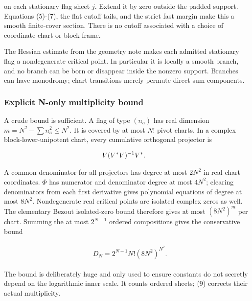 on each stationary flag sheet \(j\). Extend it by zero outside the
padded support. Equations (5)-(7), the flat cutoff tails, and the strict
fast margin make this a smooth finite-cover section. There is no cutoff
associated with a choice of coordinate chart or block frame.

The Hessian estimate from the geometry note makes each admitted
stationary flag a nondegenerate critical point. In particular it is
locally a smooth branch, and no branch can be born or disappear inside
the nonzero support. Branches can have monodromy; chart transitions
merely permute direct-sum components.

\subsubsection{Explicit N-only multiplicity
bound}\label{j-explicit-n-only-multiplicity-bound}

A crude bound is sufficient. A flag of type \((n_{a})\) has real
dimension \(m=N^{2}-\sum  n_{a}^{2}\le N^{2}\). It is covered by at most
\(N\)! pivot charts. In a complex block-lower-unipotent chart, every
cumulative orthogonal projector is

\begin{gather*}
\begin{aligned}
& V(V^{*}V)^{-1}V^{*}.
\end{aligned}\notag
\end{gather*}

A common denominator for all projectors has degree at most \(2N^{2}\) in
real chart coordinates. \(\Phi\) has numerator and denominator degree at
most \(4N^{2}\); clearing denominators from each first derivative gives
polynomial equations of degree at most \(8N^{2}\). Nondegenerate real
critical points are isolated complex zeros as well. The elementary
Bezout isolated-zero bound therefore gives at most \((8N^{2})^{m}\) per
chart. Summing the at most \(2^{N-1}\) ordered compositions gives the
conservative bound

\begin{gather*}
\begin{aligned}
& D_{N}=2^{N-1} N! (8N^{2})^{N^{2}}.
\end{aligned}\tag{10}
\end{gather*}

The bound is deliberately huge and only used to ensure constants do not
secretly depend on the logarithmic inner scale. It counts ordered
sheets; (9) corrects their actual multiplicity.


